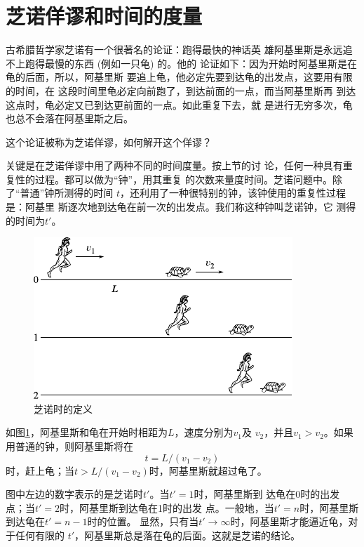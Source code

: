 \section{芝诺佯谬和时间的度量}\label{sec:01.02}

古希腊哲学家芝诺有一个很著名的论证：跑得最快的神话英
雄阿基里斯是永远追不上跑得最慢的东西 (例如一只龟) 的。他的
论证如下：因为开始时阿基里斯是在龟的后面，所以，阿基里斯
要追上龟，他必定先要到达龟的出发点，这要用有限的时间，在
这段时间里龟必定向前跑了，到达前面的一点，而当阿基里斯再
到达这点时，龟必定又已到达更前面的一点。如此重复下去，就
是进行无穷多次，龟也总不会落在阿基里斯之后。

这个论证被称为芝诺佯谬，如何解开这个佯谬？

关键是在芝诺佯谬中用了两种不同的时间度量。按上节的讨
论，任何一种具有重复性的过程。都可以做为“钟”，用其重复
的次数来量度时间。芝诺问题中。除了“普通”钟所测得的时间
$t$，还利用了一种很特别的钟，该钟使用的重复性过程是：阿基里
斯逐次地到达龟在前一次的出发点。我们称这种钟叫芝诺钟，它
测得的时间为$t'$。

\begin{figure}[!h]
 \centering
 \includegraphics{figure/fig01.02}
 \caption{芝诺时的定义}\label{fig:01.02}
\end{figure}

如图\ref{fig:01.02}，阿基里斯和龟在开始时相距为$L$，速度分别为$v_1$及
$v_2$，并且$v_1>v_2$。如果用普通的钟，则阿基里斯将在
\begin{equation}
 t=L/\left(v_1-v_2\right)
 \label{eqn:01.02.01}
\end{equation}
时，赶上龟；当$t>L/\left(v_1-v_2\right)$时，阿基里斯就超过龟了。

图中左边的数字表示的是芝诺时$t'$。当$t'=1$时，阿基里斯到
达龟在0时的出发点；当$t'=2$时，阿基里斯到达龟在1时的出发
点。一般地，当$t'=n$时，阿基里斯到达龟在$t'=n-1$时的位置。
显然，只有当$t'\to\infty$时，阿基里斯才能逼近龟，对于任何有限的
$t'$，阿基里斯总是落在龟的后面。这就是芝诺的结论。

